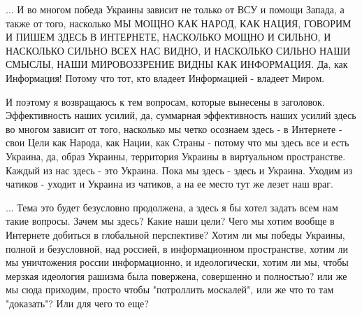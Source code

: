 ... И во многом победа Украины зависит не только от ВСУ и помощи Запада, а также от
того, насколько МЫ МОЩНО КАК НАРОД, КАК НАЦИЯ, ГОВОРИМ И ПИШЕМ ЗДЕСЬ В
ИНТЕРНЕТЕ, НАСКОЛЬКО МОЩНО И СИЛЬНО, И НАСКОЛЬКО СИЛЬНО ВСЕХ НАС ВИДНО, И
НАСКОЛЬКО СИЛЬНО НАШИ СМЫСЛЫ, НАШИ МИРОВОЗЗРЕНИЕ ВИДНЫ КАК ИНФОРМАЦИЯ. Да, как
Информация! Потому что тот, кто владеет Информацией - владеет Миром.

И поэтому я возвращаюсь к тем вопросам, которые вынесены в заголовок.
Эффективность наших усилий, да, суммарная эффективность наших усилий здесь во
многом зависит от того, насколько мы четко осознаем здесь - в Интернете - свои
Цели как Народа, как Нации, как Страны - потому что мы здесь все и есть
Украина, да, образ Украины, территория Украины в виртуальном пространстве.
Каждый из нас здесь - это Украина.  Пока мы здесь - здесь и Украина. Уходим из
чатиков - уходит и Украина из чатиков, а на ее место тут же лезет наш враг.

... Тема это будет безусловно продолжена, а здесь я бы хотел задать всем нам
такие вопросы.  Зачем мы здесь? Какие наши цели? Чего мы хотим вообще в
Интернете добиться в глобальной перспективе? Хотим ли мы победы Украины, полной
и безусловной, над россией, в информационном пространстве, хотим ли мы
уничтожения россии информационно, и идеологически, хотим ли мы, чтобы мерзкая
идеология рашизма была повержена, совершенно и полностью?  или же мы сюда
приходим, просто чтобы "потроллить москалей", или же что то там "доказать"?
Или для чего то еще? 
